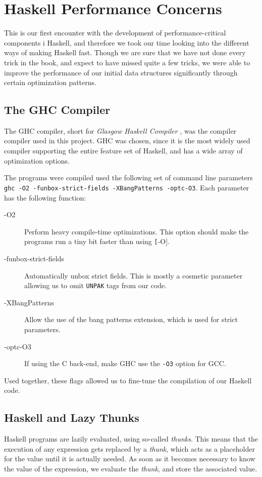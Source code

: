 \section{Haskell Performance Concerns}

This is our first encounter with the development of performance-critical components i Haskell, and therefore we took our time looking into the different ways of making Haskell fast. Though we are sure that we have not done every trick in the book, and expect to have missed quite a few tricks, we were able to improve the performance of our initial data structures significantly through certain optimization patterns.

\subsection{The GHC Compiler}
The GHC compiler, short for \textit{Glasgow Haskell Compiler} \citep{ghc}, was the compiler compiler used  in this project. GHC was chosen, since it is the most widely used compiler supporting the entire feature set of Haskell, and has a wide array of optimization options.

The programs were compiled used the following set of command line parameters \texttt{ghc -O2 -funbox-strict-fields -XBangPatterns -optc-O3}. Each parameter has the following function:
\begin{description}
\item[-O2] Perform heavy compile-time optimizations. This option should make the programs run a tiny bit faster than using \texttt[-O].
\item[-funbox-strict-fields] Automatically unbox strict fields. This is mostly a cosmetic parameter allowing us to omit \texttt{UNPAK} tags from our code.
\item[-XBangPatterns] Allow the use of the bang patterns extension, which is used for strict parameters.
\item[-optc-O3] If using the C back-end, make GHC use the \texttt{-O3} option for GCC.
\end{description}

Used together, these flags allowed us to fine-tune the compilation of our Haskell code.

\subsection{Haskell and Lazy Thunks}

Haskell programs are lazily evaluated, using so-called \textit{thunks}. This means that the execution of any expression gets replaced by a \textit{thunk}, which acts as a placeholder for the value until it is actually needed. As soon as it becomes necessary to know the value of the expression, we evaluate the \textit{thunk}, and store the associated value.

